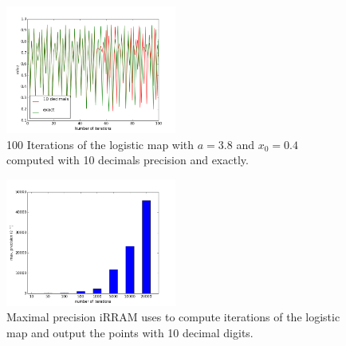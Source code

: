 \begin{figure}\label{fig:logmaperror1}
\centering
\includegraphics[width=0.5\textwidth]{dynamic_systems/logmap1}
\caption{100 Iterations of the logistic map with $a=3.8$ and $x_0 = 0.4$ computed with 10 decimals precision and exactly.}
\end{figure}
\begin{figure}\label{fig:logmapprec}
\centering
\includegraphics[width=0.5\textwidth]{dynamic_systems/logmap2}
\caption{Maximal precision iRRAM uses to compute iterations of the logistic map and output the points with 10 decimal digits.}
\end{figure}
